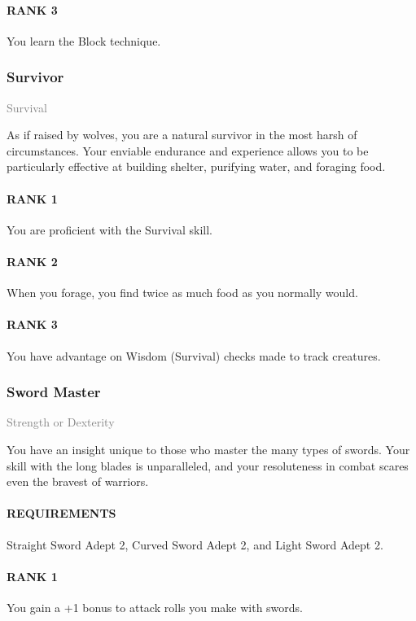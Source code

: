 \paragraph{RANK 3} You learn the Block technique.

\subsubsection{Survivor} \label{feat::survivor}
\small{\textcolor{gray}{Survival}}

\normalsize
As if raised by wolves, you are a natural survivor in the most harsh of circumstances.
Your enviable endurance and experience allows you to be particularly effective at building shelter, purifying water, and foraging food.
\paragraph{RANK 1} You are proficient with the Survival skill.
\paragraph{RANK 2} When you forage, you find twice as much food as you normally would.
\paragraph{RANK 3} You have advantage on Wisdom (Survival) checks made to track creatures.

\subsubsection{Sword Master} \label{feat::swordmaster}
\small{\textcolor{gray}{Strength or Dexterity}}

\normalsize
You have an insight unique to those who master the many types of swords.
Your skill with the long blades is unparalleled, and your resoluteness in combat scares even the bravest of warriors.
\paragraph{REQUIREMENTS} Straight Sword Adept 2, Curved Sword Adept 2, and Light Sword Adept 2.
\paragraph{RANK 1} You gain a +1 bonus to attack rolls you make with swords.
